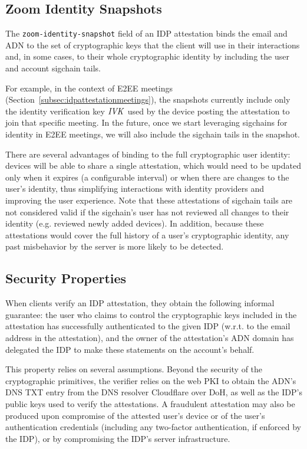 \subsection{Zoom Identity Snapshots}
\label{subsec:snapshots}

The \texttt{zoom-identity-snapshot} field of an IDP attestation binds the email and ADN to the set
of cryptographic keys that the client will use in their interactions and, in some cases, to their
whole cryptographic identity by including the user and account sigchain tails.

For example, in the context of E2EE meetings (Section~\ref{subsec:idpattestationmeetings}), the
snapshots currently include only the identity verification key $\mathit{IVK}$ used by the device posting the
attestation to join that specific meeting. In the future, once we start leveraging sigchains for
identity in E2EE meetings, we will also include the sigchain tails in the snapshot. 

There are several advantages of binding to the full cryptographic user identity: devices will be
able to share a single attestation, which would need to be updated only when it expires (a
configurable interval) or when there are changes to the user's identity, thus simplifying
interactions with identity providers and improving the user experience. Note that these attestations
of sigchain tails are not considered valid if the sigchain's user has not reviewed all changes to
their identity (e.g. reviewed newly added devices). In addition, because these attestations would
cover the full history of a user's cryptographic identity, any past misbehavior by the server is
more likely to be detected.

\subsection{Security Properties}\label{subsec:idpsecurity}

When clients verify an IDP attestation, they obtain the following informal guarantee: the user who
claims to control the cryptographic keys included in the attestation has successfully authenticated
to the given IDP (w.r.t. to the email address in the attestation), and the owner of the
attestation's ADN domain has delegated the IDP to make these statements on the account's behalf.

This property relies on several assumptions. Beyond the security of the cryptographic primitives,
the verifier relies on the web PKI to obtain the ADN's DNS TXT entry from the DNS resolver
Cloudflare over DoH, as well as the IDP's public keys used to verify the attestations. A fraudulent
attestation may also be produced upon compromise of the attested user's device or of the user's
authentication credentials (including any two-factor authentication, if enforced by the IDP), or by
compromising the IDP's server infrastructure.

